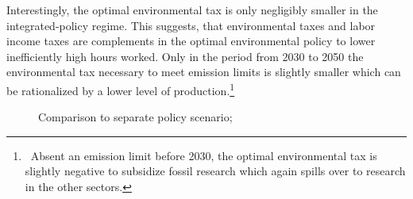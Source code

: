 Interestingly, the optimal environmental tax is only negligibly smaller in the integrated-policy regime. This suggests, that environmental taxes and labor income taxes are complements in the optimal environmental policy to lower inefficiently high hours worked. Only in the period from 2030 to 2050 the environmental tax necessary to meet emission limits is slightly smaller which can be rationalized by a lower level of production.\footnote{\ Absent an emission limit before 2030, the optimal environmental tax is slightly negative to subsidize fossil research which again spills over to research in the other sectors. }  

\begin{figure}[h!!]
	\centering
	\caption{Comparison to separate policy scenario; }\label{fig:bench_nored_notaul}
	

\end{figure}
